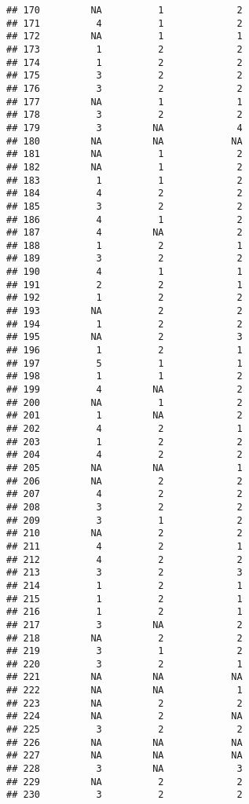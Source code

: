 \documentclass[
]{article}
\begin{document}
\begin{verbatim}
## 170         NA          1             2
## 171          4          1             2
## 172         NA          1             1
## 173          1          2             2
## 174          1          2             2
## 175          3          2             2
## 176          3          2             2
## 177         NA          1             1
## 178          3          2             2
## 179          3         NA             4
## 180         NA         NA            NA
## 181         NA          1             2
## 182         NA          1             2
## 183          1          1             2
## 184          4          2             2
## 185          3          2             2
## 186          4          1             2
## 187          4         NA             2
## 188          1          2             1
## 189          3          2             2
## 190          4          1             1
## 191          2          2             1
## 192          1          2             2
## 193         NA          2             2
## 194          1          2             2
## 195         NA          2             3
## 196          1          2             1
## 197          5          1             1
## 198          1          1             2
## 199          4         NA             2
## 200         NA          1             2
## 201          1         NA             2
## 202          4          2             1
## 203          1          2             2
## 204          4          2             2
## 205         NA         NA             1
## 206         NA          2             2
## 207          4          2             2
## 208          3          2             2
## 209          3          1             2
## 210         NA          2             2
## 211          4          2             1
## 212          4          2             2
## 213          3          2             3
## 214          1          2             1
## 215          1          2             1
## 216          1          2             1
## 217          3         NA             2
## 218         NA          2             2
## 219          3          1             2
## 220          3          2             1
## 221         NA         NA            NA
## 222         NA         NA             1
## 223         NA          2             2
## 224         NA          2            NA
## 225          3          2             2
## 226         NA         NA            NA
## 227         NA         NA            NA
## 228          3         NA             3
## 229         NA          2             2
## 230          3          2             2

\end{verbatim}
\end{document}
